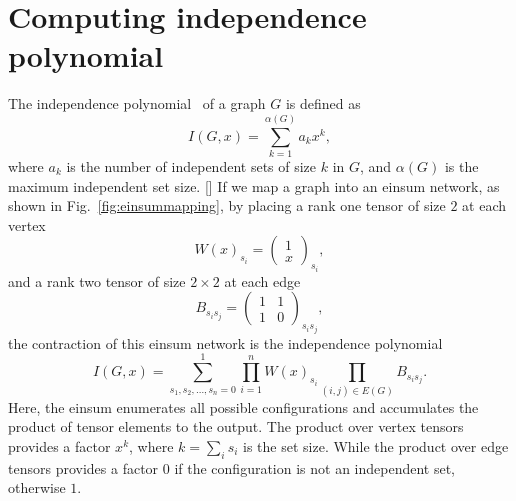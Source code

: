 \documentclass{article}
\newcommand{\<}{\langle}
\renewcommand{\>}{\rangle}
\renewcommand{\cite}[1]{{\citep{#1}}}
\newcommand{\Fig}[1]{Fig.~\ref{#1}}
\newcommand{\blue}[1]{[{\bf  \color{blue}{JG: #1}}]}
\theoremstyle{definition}\newtheorem{definition}{\textit{Definition}}
\begin{document}
\section{Computing independence polynomial}
The independence polynomial~\cite{Ferrin2014, Harvey2017} of a graph $G$ is defined as
\begin{equation}
I(G, x) = \sum_{k=1}^{\alpha(G)} a_k x^k,
\end{equation}
where $a_k$ is the number of independent sets of size $k$ in $G$, and $\alpha(G)$ is the maximum independent set size.
\blue{here, I preassumed a user knows tensor network, add more details later.}
If we map a graph into an einsum network, as shown in \Fig{fig:einsummapping}, by placing a rank one tensor of size $2$ at each vertex
\begin{equation}
    W(x)_{s_i} = \left(\begin{matrix}
        1 \\
        x
    \end{matrix}\right)_{s_i},
\end{equation}
and a rank two tensor of size $2 \times 2$ at each edge
\begin{equation}
    B_{s_i s_j} = \left(\begin{matrix}
        1  & 1\\
        1 & 0
    \end{matrix}\right)_{s_is_j},
\end{equation}
the contraction of this einsum network is the independence polynomial %
\begin{equation}
    I(G, x) = \sum\limits_{s_1, s_2, \ldots, s_n = 0}^{1} \prod\limits_{i=1}^n W(x)_{s_i} \prod\limits_{(i,j) \in E(G)} B_{s_i s_j}.
\end{equation}
Here, the einsum enumerates all possible configurations and accumulates the product of tensor elements to the output.
The product over vertex tensors provides a factor $x^k$, where $k=\sum_i s_i$ is the set size.
While the product over edge tensors provides a factor $0$ if the configuration is not an independent set, otherwise $1$.
\end{document}
